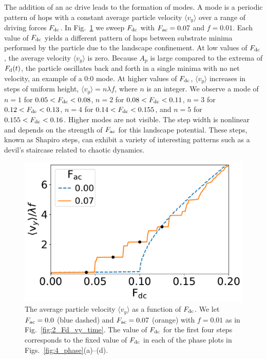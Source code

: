\documentclass[preprint,showpacs,preprintnumbers,amsmath,amssymb,aps,prb]{revtex4-1}
\theoremstyle{remark}
\begin{document}
The addition of an ac drive leads
  to the formation of modes.
  A mode is a periodic pattern of hops
  with a constant average particle velocity $\langle {v}_{y} \rangle$
  over a range of driving forces $F_{\rm dc}$.
  In Fig.~\ref{fig:3_sweep_vyFDC}
  we sweep $F_{\rm dc}$
  with $F_{\rm ac} = 0.07$ and $f=0.01$.
Each value of $F_{\rm dc}$ yields a different pattern of hops
between substrate minima
performed by the particle
due to the landscape confinement.  %
At 
low values of $F_{\rm dc}$, the average velocity $\langle v_y \rangle$ is zero.
Because 
$A_p$ is large compared to the extrema of $F_{\rm d}(t)$,
the particle oscillates back and forth
in a single minima with no net velocity, an example of 
a 0:0 mode.
At higher values of $F_{\rm dc}$,    
$\langle v_{y} \rangle$ increases in steps of uniform height,
$\langle v_{y} \rangle = n \lambda f$,
where $n$ is an integer.
We observe a mode of $n=1$
for   $0.05 < F_{\rm dc} < 0.08$,
$n=2$ for $0.08 < F_{\rm dc} < 0.11$,
$n=3$ for $0.12 < F_{\rm dc} < 0.13$,
$n=4$ for $0.14 < F_{\rm dc} < 0.155$, and 
$n=5$ for $0.155 < F_{\rm dc} < 0.16$.
Higher modes are not visible.
The step width is nonlinear
and depends on the strength of $F_{\rm ac}$
for this landscape potential.\cite{Reichhardt2000,Juniper2017}
These steps, known as Shapiro steps, can exhibit a variety of
interesting patterns
such as a devil's staircase related to chaotic dynamics.\cite{Bak1986}

\begin{figure}[h]
\centering
\includegraphics[width=\columnwidth]{fig3_sweep_vyFDC.pdf}
\caption{The average particle velocity  $\langle v_{y} \rangle$
  as a function of $F_{\rm dc}$.
  We let
  $F_{\rm ac}=0.0$ (blue dashed) and 
  $F_{\rm ac}=0.07$ (orange) with $f = 0.01$ 
  as in Fig.~\ref{fig:2_Fd_vy_time}.
  The value of $F_{\rm dc}$ for the first four steps
  corresponds to the fixed value of $F_{\rm dc}$
  in each of the phase plots
  in Figs.~\ref{fig:4_phase}(a)--(d).
}
\label{fig:3_sweep_vyFDC}
\end{figure}
\end{document}
